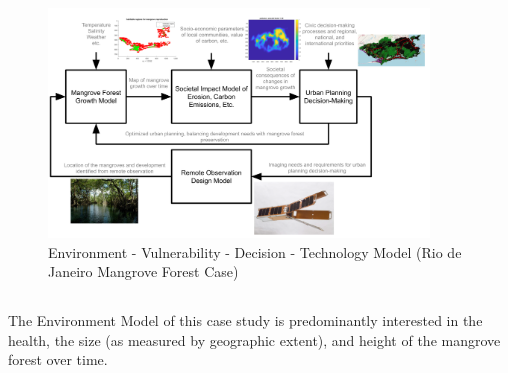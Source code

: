 \begin{figure}[H]
\centering
\includegraphics[width=0.9\textwidth]{Figures/chap4/MangroveModelFlow.png}
\caption[EVDT Model (Rio de Janeiro Mangrove Forest Case)]{Environment - Vulnerability - Decision - Technology Model (Rio de Janeiro Mangrove Forest Case)}
\label{fig:rio-evdt-flow}
\end{figure}


\subsection{} \label{sec:rio-evdt-method}

\subsubsection{} \label{sec:rio-evdt-e-method}

The Environment Model of this case study is predominantly interested in the health, the size (as measured by geographic extent), and height of the mangrove forest over time. 

